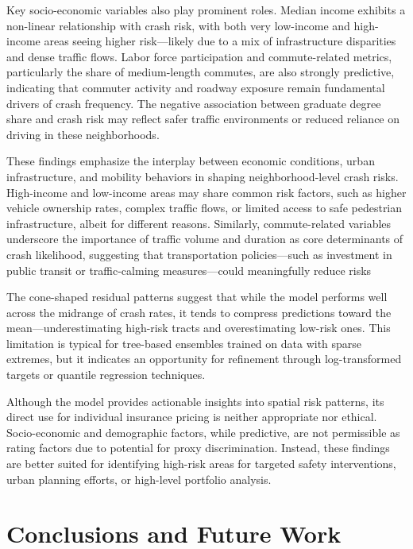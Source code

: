 \documentclass[
  number,
  review,
  3p]{elsarticle}
\begin{document}
Key socio-economic variables also play prominent roles. Median income
exhibits a non-linear relationship with crash risk, with both very
low-income and high-income areas seeing higher risk---likely due to a
mix of infrastructure disparities and dense traffic flows. Labor force
participation and commute-related metrics, particularly the share of
medium-length commutes, are also strongly predictive, indicating that
commuter activity and roadway exposure remain fundamental drivers of
crash frequency. The negative association between graduate degree share
and crash risk may reflect safer traffic environments or reduced
reliance on driving in these neighborhoods.

These findings emphasize the interplay between economic conditions,
urban infrastructure, and mobility behaviors in shaping
neighborhood-level crash risks. High-income and low-income areas may
share common risk factors, such as higher vehicle ownership rates,
complex traffic flows, or limited access to safe pedestrian
infrastructure, albeit for different reasons. Similarly, commute-related
variables underscore the importance of traffic volume and duration as
core determinants of crash likelihood, suggesting that transportation
policies---such as investment in public transit or traffic-calming
measures---could meaningfully reduce risks

The cone-shaped residual patterns suggest that while the model performs
well across the midrange of crash rates, it tends to compress
predictions toward the mean---underestimating high-risk tracts and
overestimating low-risk ones. This limitation is typical for tree-based
ensembles trained on data with sparse extremes, but it indicates an
opportunity for refinement through log-transformed targets or quantile
regression techniques.

Although the model provides actionable insights into spatial risk
patterns, its direct use for individual insurance pricing is neither
appropriate nor ethical. Socio-economic and demographic factors, while
predictive, are not permissible as rating factors due to potential for
proxy discrimination. Instead, these findings are better suited for
identifying high-risk areas for targeted safety interventions, urban
planning efforts, or high-level portfolio analysis.

\section{Conclusions and Future Work}\label{conclusions-and-future-work}
\end{document}
